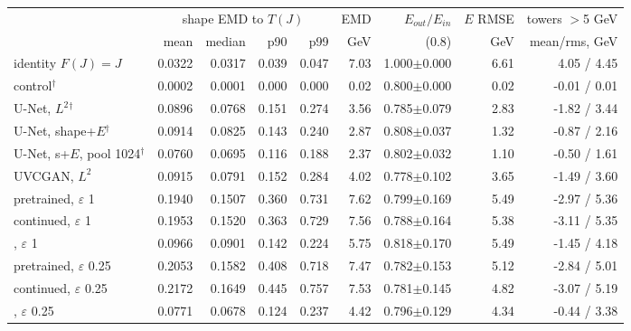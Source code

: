 \scriptsize
\setlength{\tabcolsep}{3pt}
\begin{tabular}{lrrrrrrrr}
\toprule
 & \multicolumn{4}{c}{shape EMD to $T(J)$} & EMD & $E_{out}/E_{in}$ & $E$ RMSE & towers $>$5 GeV \\
 & mean & median & p90 & p99 & GeV & (0.8) & GeV & mean/rms, GeV \\
\midrule
identity $F(J) = J$ & 0.0322 & 0.0317 & 0.039 & 0.047 & 7.03 & 1.000$\pm$0.000 & 6.61 & 4.05 / 4.45 \\
\pai{} control$^\dagger$ & 0.0002 & 0.0001 & 0.000 & 0.000 & 0.02 & 0.800$\pm$0.000 & 0.02 & -0.01 / 0.01 \\
\ot{} U-Net, $L^2$$^\dagger$ & 0.0896 & 0.0768 & 0.151 & 0.274 & 3.56 & 0.785$\pm$0.079 & 2.83 & -1.82 / 3.44 \\
\ot{} U-Net, shape+$E$$^\dagger$ & 0.0914 & 0.0825 & 0.143 & 0.240 & 2.87 & 0.808$\pm$0.037 & 1.32 & -0.87 / 2.16 \\
\ot{} U-Net, s+$E$, pool 1024$^\dagger$ & 0.0760 & 0.0695 & 0.116 & 0.188 & 2.37 & 0.802$\pm$0.032 & 1.10 & -0.50 / 1.61 \\
\ot{} UVCGAN, $L^2$ & 0.0915 & 0.0791 & 0.152 & 0.284 & 4.02 & 0.778$\pm$0.102 & 3.65 & -1.49 / 3.60 \\
\br{} pretrained, $\varepsilon$ 1 & 0.1940 & 0.1507 & 0.360 & 0.731 & 7.62 & 0.799$\pm$0.169 & 5.49 & -2.97 / 5.36 \\
\br{} continued, $\varepsilon$ 1 & 0.1953 & 0.1520 & 0.363 & 0.729 & 7.56 & 0.788$\pm$0.164 & 5.38 & -3.11 / 5.35 \\
\dsbm{}, $\varepsilon$ 1 & 0.0966 & 0.0901 & 0.142 & 0.224 & 5.75 & 0.818$\pm$0.170 & 5.49 & -1.45 / 4.18 \\
\br{} pretrained, $\varepsilon$ 0.25 & 0.2053 & 0.1582 & 0.408 & 0.718 & 7.47 & 0.782$\pm$0.153 & 5.12 & -2.84 / 5.01 \\
\br{} continued, $\varepsilon$ 0.25 & 0.2172 & 0.1649 & 0.445 & 0.757 & 7.53 & 0.781$\pm$0.145 & 4.82 & -3.07 / 5.19 \\
\dsbm{}, $\varepsilon$ 0.25 & 0.0771 & 0.0678 & 0.124 & 0.237 & 4.42 & 0.796$\pm$0.129 & 4.34 & -0.44 / 3.38 \\
\bottomrule
\end{tabular}
